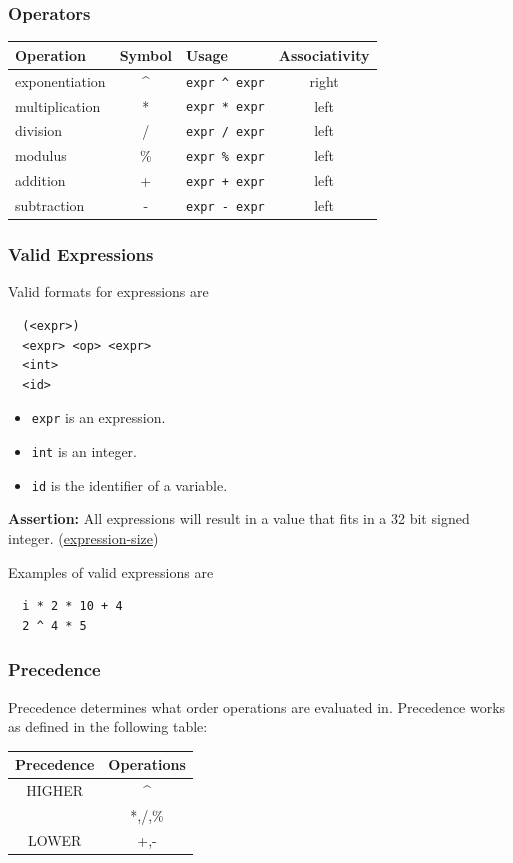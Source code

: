 \documentclass{article}
\newcommand{\code}[1]{\texttt{\textmd{#1}}}
\newcommand{\assertion}[2]{\textbf{Assertion: }#1 (\hyperlink{#2}{#2})}
\begin{document}
\subsubsection{Operators}
\begin{center}
  \begin{tabular}{|l|c|l|c|}
    \hline
    \textbf{Operation} & \textbf{Symbol} & \textbf{Usage} &
    \textbf{Associativity} \\
    \hline
    exponentiation & \textasciicircum & \code{expr \textasciicircum\ expr} & right\\
    multiplication & *  & \code{expr * expr}  & left \\
    division       & /  & \code{expr / expr}  & left \\
    modulus        & \% & \code{expr \% expr}  & left \\
    addition       & +  & \code{expr + expr}  & left \\
    subtraction    & -  & \code{expr - expr}  & left \\
    \hline
  \end{tabular}
\end{center}

\subsubsection{Valid Expressions}
Valid formats for expressions are
\begin{lstlisting}
  (<expr>)
  <expr> <op> <expr>
  <int>
  <id>
\end{lstlisting}

\begin{itemize}
  \item \code{expr} is an expression.
  \item \code{int} is an integer.
  \item \code{id} is the identifier of a variable.
\end{itemize}

\assertion{All expressions will result in a value that fits in a 32 bit signed integer.}
{expression-size}

Examples of valid expressions are
\begin{lstlisting}
  i * 2 * 10 + 4
  2 ^ 4 * 5
\end{lstlisting}

\subsubsection{Precedence}
Precedence determines what order operations are evaluated in. Precedence works as defined in the
following table:
\begin{center}
  \begin{tabular}{|c|c|}
    \hline
    \textbf{Precedence} & \textbf{Operations} \\
    \hline
    HIGHER & \textasciicircum \\
           & *,/,\% \\
    LOWER  & +,- \\
    \hline
  \end{tabular}
\end{center}
\end{document}
